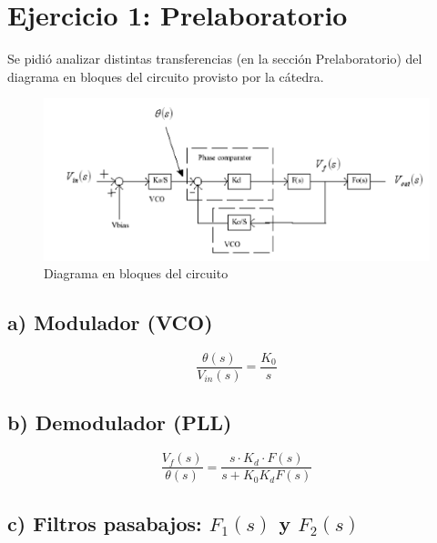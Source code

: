 \documentclass{article}
\begin{document}
\newgeometry{} %



\tableofcontents
\newpage

\section*{Ejercicio 1: Prelaboratorio}
Se pidió analizar distintas transferencias (en la sección Prelaboratorio) del diagrama en bloques del circuito provisto por la cátedra.
\begin{figure}[H]
\centering
\includegraphics[width=1\linewidth]{images/Circuito.PNG}
\caption{Diagrama en bloques del circuito}
\label{fig:Circuito}
\end{figure}

\subsection*{a) Modulador (VCO)}

\begin{equation} \label{mod_eqn}
\frac{\theta(s)}{V_{in}(s)} = \frac{K_0}{s}
\end{equation}

\subsection*{b) Demodulador (PLL)}

\begin{equation} \label{demod_eqn}
\frac{V_f(s)}{\theta(s)} = \frac{s\cdot K_d \cdot F(s)}{s+K_0K_dF(s)}
\end{equation}

\subsection*{c) Filtros pasabajos: $F_1(s)$ y $F_2(s)$}
\end{document}
